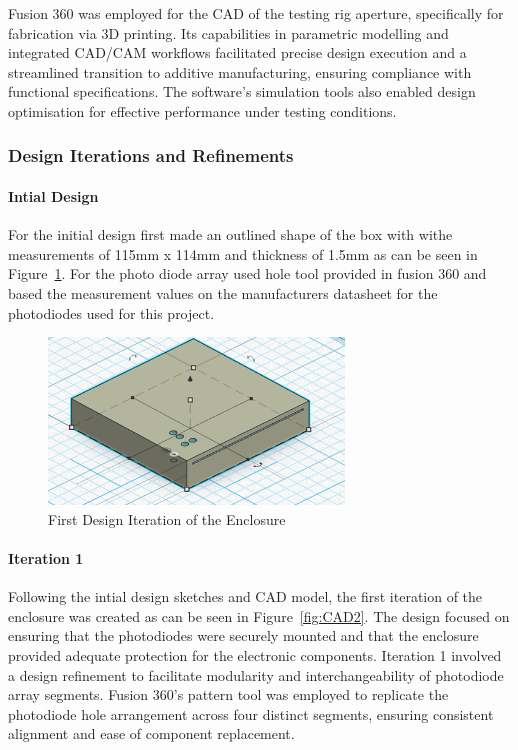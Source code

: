 Fusion 360 was employed for the CAD of the testing rig aperture, specifically for fabrication via 3D printing. 
Its capabilities in parametric modelling and integrated CAD/CAM workflows facilitated precise design execution and a streamlined transition to additive manufacturing, ensuring compliance with functional specifications. 
The software's simulation tools also enabled design optimisation for effective performance under testing conditions.

\subsubsection{Design Iterations and Refinements}
\paragraph{Intial Design}

For the initial design first made an outlined shape of the box with withe measurements of 115mm x 114mm and thickness of 1.5mm as can be seen in Figure~\ref{fig:CAD1}.
For the photo diode array used hole tool provided in fusion 360 and based the measurement values on the manufacturers datasheet for the photodiodes used for this project.



\begin{figure}[htbp]
    \centering
    \includegraphics[width=0.7\textwidth]{figures/CAD-3DPrint/FirstIteration.png}
    \caption{First Design Iteration of the Enclosure}
    \label{fig:CAD1}
\end{figure}


\paragraph{Iteration 1}

Following the intial design sketches and CAD model, the first iteration of the enclosure was created as can be seen in Figure~\ref{fig:CAD2}.
The design focused on ensuring that the photodiodes were securely mounted and that the enclosure provided adequate protection for the electronic components. 
Iteration 1 involved a design refinement to facilitate modularity and interchangeability of photodiode array segments. 
Fusion 360's pattern tool was employed to replicate the photodiode hole arrangement across four distinct segments, ensuring consistent alignment and ease of component replacement.

